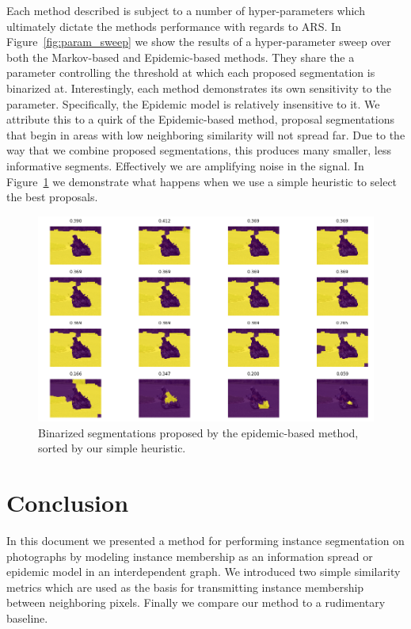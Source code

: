 \documentclass[twocolumn]{article}
\newcommand{\figref}[1]{Figure~\ref{fig:#1}}
\newcommand{\figlab}[1]{\label{fig:#1}}
\begin{document}
Each method described is subject to a number of hyper-parameters which ultimately 
dictate the methods performance with regards to ARS. In \figref{param_sweep} we
show the results of a hyper-parameter sweep over both the Markov-based and
Epidemic-based methods. They share the a parameter controlling the threshold at
which each proposed segmentation is binarized at. Interestingly, each method
demonstrates its own sensitivity to the parameter. Specifically, the Epidemic
model is relatively insensitive to it. We attribute this to a quirk of the
Epidemic-based method, proposal segmentations that begin in areas with low
neighboring similarity will not spread far. Due to the way that we combine
proposed segmentations, this produces many smaller, less informative segments.
Effectively we are amplifying noise in the signal. In \figref{epidemic_only} we
demonstrate what happens when we use a simple heuristic to select the best
proposals.

\begin{figure}[t]
    \includegraphics[width=\linewidth]{figs/epidemic_heuristic.png}
    \caption{Binarized segmentations proposed by the epidemic-based method,
    sorted by our simple heuristic.}
    \figlab{epidemic_only}
\end{figure}

\section{Conclusion}

In this document we presented a method for performing instance segmentation on
photographs by modeling instance membership as an information spread or epidemic
model in an interdependent graph. We introduced two simple similarity metrics
which are used as the basis for transmitting instance membership between
neighboring pixels. Finally we compare our method to a rudimentary baseline.
\end{document}
